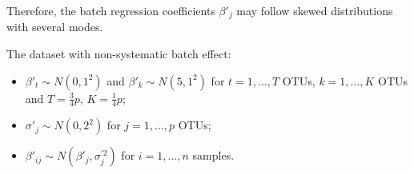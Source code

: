 \documentclass[]{book}
\providecommand{\tightlist}{%
  \setlength{\itemsep}{0pt}\setlength{\parskip}{0pt}}
\begin{document}
Therefore, the batch regression coefficients \(\beta'_{j}\) may follow
skewed distributions with several modes.

The dataset with non-systematic batch effect:

\begin{itemize}
\tightlist
\item
  \(\beta'_{t} \sim N(0,1^{2})\) and \(\beta'_{k} \sim N(5,1^{2})\) for
  \(t=1,...,T\) OTUs, \(k=1,...,K\) OTUs and \(T=\frac{3}{4}p\),
  \(K=\frac{1}{4}p\);\\
\item
  \(\sigma'_{j} \sim N(0,2^{2})\) for \(j=1,...,p\) OTUs;\\
\item
  \(\beta'_{ij} \sim N(\beta'_{j}, \sigma_{j}^{'2})\) for
  \(i = 1,...,n\) samples.
\end{itemize}
\end{document}
